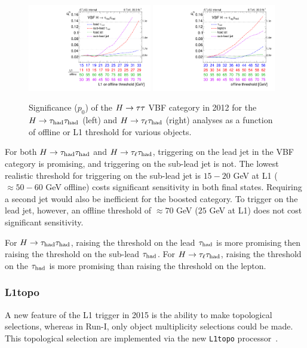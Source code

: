 \begin{figure}[!htpb]
  \centering
  \includegraphics[width=0.48\textwidth]{figures/trigger/evolution_hadhad}
  \includegraphics[width=0.48\textwidth]{figures/trigger/evolution_lephad}
  \caption{Significance ($p_0$) of the $H\rightarrow\tau\tau$ VBF category in 2012 for the $H\rightarrow\tau_\text{had}\tau_\text{had}$ (left) and $H\rightarrow\tau_\ell\tau_\text{had}$ (right) analyses as a function of offline or L1 threshold for various objects.}
  \label{fig:prospects-trigger-evolution}
\end{figure}

For both $H\rightarrow\tau_\text{had}\tau_\text{had}$ and $H\rightarrow\tau_\ell\tau_\text{had}$, triggering on the lead jet in the VBF category is promising, and triggering on the sub-lead jet is not. The lowest realistic threshold for triggering on the sub-lead jet is $15-20$ GeV at L1 ($\approx\! 50-60$ GeV offline) costs significant sensitivity in both final states. Requiring a second jet would also be inefficient for the boosted category. To trigger on the lead jet, however, an offline threshold of $\approx\! 70$ GeV ($25$ GeV at L1) does not cost significant sensitivity.

For $H\rightarrow\tau_\text{had}\tau_\text{had}$, raising the threshold on the lead $\tau_\text{had}$ is more promising then raising the threshold on the sub-lead $\tau_\text{had}$. For $H\rightarrow\tau_\ell\tau_\text{had}$, raising the threshold on the $\tau_\text{had}$ is more promising than raising the threshold on the lepton.

\subsubsection{L1topo}

A new feature of the L1 trigger in 2015 is the ability to make topological selections, whereas in Run-I, only object multiplicity selections could be made. This topological selection are implemented via the new \texttt{L1topo} processor~\cite{ATL-DAQ-PROC-2013-039,ATL-COM-DAQ-2014-005}.


